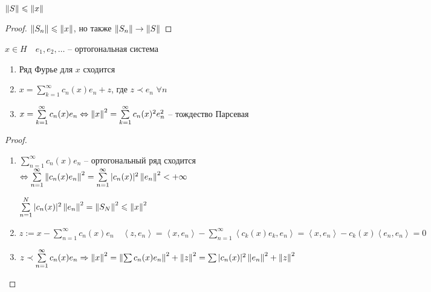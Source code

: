 \begin{consequence}\thmslashn
	
	$\left\|S\right\| \leqslant \left\|x\right\|$
	
\end{consequence}

\begin{proof}\thmslashn
	
	$\left\|S_n\right\| \leqslant \left\|x\right\|$, но также $\left\|S_n\right\| \to \left\|S\right\|$
	
\end{proof}

\begin{theorem}\thmslashn 
	
	$x \in H \quad e_1, e_2, \ldots$ -- ортогональная система
	
	\begin{enumerate}
		\item 
		Ряд Фурье для $x$ сходится
		
		\item
		$x = \sum\limits_{k = 1}^\infty c_n(x)e_n + z$, где $z \prec e_n \,\,\forall n$
		
		\item
		$x = \sum\limits_{k = 1}^\infty c_n(x)e_n \Leftrightarrow \left\|x\right\|^2 = \sum\limits_{k = 1}^\infty c_n(x)^2e_n^2$ -- тождество Парсевая
		
	\end{enumerate}
\end{theorem}

\begin{proof}\thmslashn
	
	\begin{enumerate}
		\item 
		$\sum\limits_{n = 1}^\infty c_n(x)e_n$ -- ортогональный ряд сходится $\Leftrightarrow \sum\limits_{n = 1}^\infty \left\|c_n(x)e_n\right\|^2 = \sum\limits_{n = 1}^\infty |c_n(x)|^2\left\|e_n\right\|^2 < +\infty$
		
		$\sum\limits_{n = 1}^N |c_n(x)|^2 \left\|e_n\right\|^2 = \left\|S_N\right\|^2 \leqslant \left\|x\right\|^2$
		
		\item
		$z := x - \sum\limits_{n = 1}^\infty c_n(x)e_n \quad \left\langle z, e_n \right\rangle = \left\langle x, e_n \right\rangle -  \sum\limits_{n = 1}^\infty \left\langle c_k(x)e_k, e_n \right\rangle = \left\langle x, e_n \right\rangle -  c_k(x) \left\langle e_n, e_n \right\rangle = 0$
		
		\item
		$z \prec \sum\limits_{n = 1}^\infty c_n(x)e_n \Rightarrow \left\|x\right\|^2 = \left\|\sum c_n(x)e_n\right\|^2 + \left\|z\right\|^2 = \sum |c_n(x)|^2\left\|e_n\right\|^2 + \left\|z\right\|^2$ 
		
	\end{enumerate}	
	
\end{proof}

